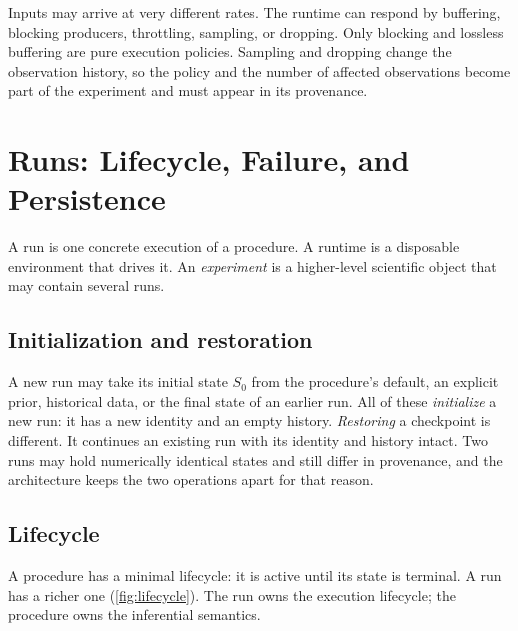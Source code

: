\documentclass[11pt,a4paper]{article}
\theoremstyle{definition}
\theoremstyle{remark}
\begin{document}
Inputs may arrive at very different rates. The runtime can respond by
buffering, blocking producers, throttling, sampling, or dropping. Only
blocking and lossless buffering are pure execution policies. Sampling
and dropping change the observation history, so the policy and the
number of affected observations become part of the experiment and must
appear in its provenance.

\section{Runs: Lifecycle, Failure, and Persistence}
\label{sec:run}

A run is one concrete execution of a procedure. A runtime is a
disposable environment that drives it. An \emph{experiment} is a
higher-level scientific object that may contain several runs.

\subsection{Initialization and restoration}

A new run may take its initial state $S_0$ from the procedure's default,
an explicit prior, historical data, or the final state of an earlier
run. All of these \emph{initialize} a new run: it has a new identity and
an empty history. \emph{Restoring} a checkpoint is different. It
continues an existing run with its identity and history intact. Two runs
may hold numerically identical states and still differ in provenance,
and the architecture keeps the two operations apart for that reason.

\subsection{Lifecycle}
\label{sec:lifecycle}

A procedure has a minimal lifecycle: it is active until its state is
terminal. A run has a richer one (\cref{fig:lifecycle}). The run owns
the execution lifecycle; the procedure owns the inferential semantics.
\end{document}
